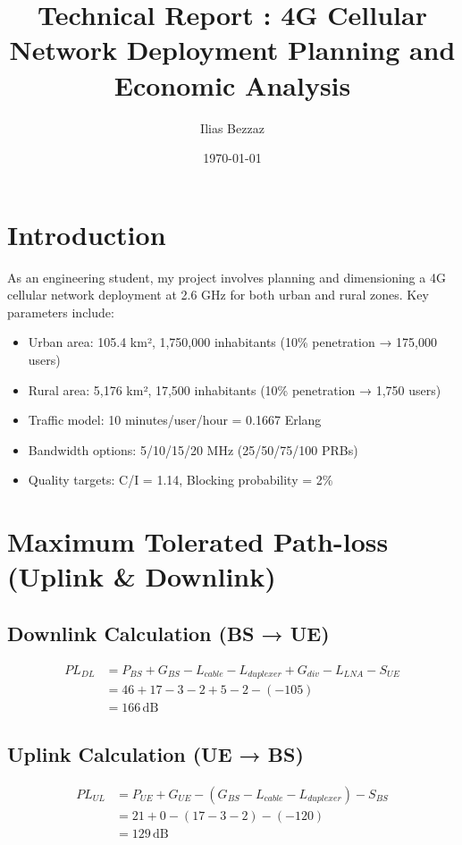 \documentclass[a4paper,12pt]{article}
\title{Technical Report : 4G Cellular Network Deployment Planning and Economic Analysis}
\author{Ilias Bezzaz}
\date{\today}
\begin{document}
\maketitle

\section{Introduction}

As an engineering student, my project involves planning and dimensioning a 4G cellular network deployment at 2.6 GHz for both urban and rural zones. Key parameters include:

\begin{itemize}
    \item Urban area: 105.4 km², 1,750,000 inhabitants (10\% penetration → 175,000 users)
    \item Rural area: 5,176 km², 17,500 inhabitants (10\% penetration → 1,750 users)
    \item Traffic model: 10 minutes/user/hour = 0.1667 Erlang
    \item Bandwidth options: 5/10/15/20 MHz (25/50/75/100 PRBs)
    \item Quality targets: C/I = 1.14, Blocking probability = 2\%
\end{itemize}

\section{Maximum Tolerated Path-loss (Uplink \& Downlink)}

\subsection*{Downlink Calculation (BS → UE)}
\[
\begin{aligned}
PL_{DL} &= P_{BS} + G_{BS} - L_{cable} - L_{duplexer} + G_{div} - L_{LNA} - S_{UE} \\
&= 46 + 17 - 3 - 2 + 5 - 2 - (-105) \\
&= 166\,\text{dB}
\end{aligned}
\]

\subsection*{Uplink Calculation (UE → BS)}
\[
\begin{aligned}
PL_{UL} &= P_{UE} + G_{UE} - (G_{BS} - L_{cable} - L_{duplexer}) - S_{BS} \\
&= 21 + 0 - (17 - 3 - 2) - (-120) \\
&= 129\,\text{dB}
\end{aligned}
\]
\end{document}
